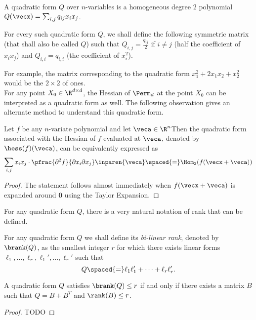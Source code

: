\begin{definition}
A quadratic form $Q$ over $n$-variables is a homogeneous degree $2$ polynomial $Q(\vecx) = \sum_{i,j} q_{ij} x_i x_j$. 

For every such quadratic form $Q$, we shall define the following symmetric matrix (that shall also be called $Q$) such that $Q_{i,j} = \frac{q_{ij}}{2}$ if $i\neq j$ (half the coefficient of $x_i x_j$) and $Q_{i,i} = q_{i,i}$ (the coefficient of $x_i^2$). 
\end{definition}

For example, the matrix corresponding to the quadratic form $x_1^2 + 2x_1x_2 + x_2^2$ would be the $2\times 2$ of ones.\\

For any point $X_0 \in \R^{d\times d}$, the Hessian of $\Perm_d$ at the point $X_0$ can be interpreted as a quadratic form as well. The following observation gives an alternate method to understand this quadratic form. 

\begin{observation}\label{obs:hessian-deg2-hom}
Let $f$ be any $n$-variate polynomial and let $\veca \in \R^n$Then the quadratic form associated with the Hessian of $f$ evaluated at $\veca$, denoted by $\hess(f)(\veca)$, can be equivalently expressed as
\[
\sum_{i,j} x_{i} x_{j} \cdot \pfrac{\partial^2 f}{\partial x_{i} \partial x_{j}}\inparen{\veca} \spaced{=} \Hom_2(f(\vecx + \veca))
\]
\end{observation}
\begin{proof}
The statement follows almost immediately when $f(\vecx + \veca)$ is expanded around $\mathbf{0}$ using the Taylor Expansion. 
\end{proof}


\noindent 
For any quadratic form $Q$, there is a very natural notation of rank that can be defined. 

\begin{definition} For any quadratic form $Q$ we shall define its \emph{bi-linear rank}, denoted by $\brank(Q)$, as the smallest integer $r$ for which there exists linear forms $\ell_1,\ldots, \ell_r, \ell_1',\ldots,  \ell_r'$ such that 
\[
Q \spaced{=} \ell_1 \ell_1' + \cdots + \ell_r \ell_r'. \qedhere
\]
\end{definition}

\begin{observation}\label{obs:brank-rank}
A quadratic form $Q$ satisfies $\brank(Q) \leq r$ if and only if there exists a matrix $B$ such that $Q = B + B^T$ and $\rank(B) \leq r$. 
\end{observation}
\begin{proof}
TODO
\end{proof}

